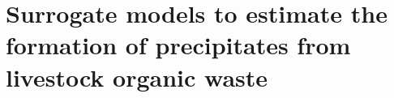 \documentclass[10pt,a4paper]{article}
\begin{document}
\newpage

%

\section{Surrogate models to estimate the formation of precipitates from livestock organic waste}
\end{document}
